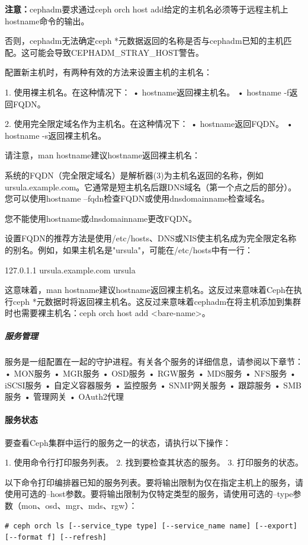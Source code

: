 \documentclass[12pt,UTF8]{ctexbook}
\begin{document}
\textbf{注意：}cephadm要求通过ceph orch host add给定的主机名必须等于远程主机上hostname命令的输出。

否则，cephadm无法确定ceph *元数据返回的名称是否与cephadm已知的主机匹配。这可能会导致CEPHADM_STRAY_HOST警告。

配置新主机时，有两种有效的方法来设置主机的主机名：

1. 使用裸主机名。在这种情况下：
   • hostname返回裸主机名。
   • hostname -f返回FQDN。

2. 使用完全限定域名作为主机名。在这种情况下：
   • hostname返回FQDN。
   • hostname -s返回裸主机名。

请注意，man hostname建议hostname返回裸主机名：

系统的FQDN（完全限定域名）是解析器(3)为主机名返回的名称，例如ursula.example.com。它通常是短主机名后跟DNS域名（第一个点之后的部分）。您可以使用hostname --fqdn检查FQDN或使用dnsdomainname检查域名。

您不能使用hostname或dnsdomainname更改FQDN。

设置FQDN的推荐方法是使用/etc/hosts、DNS或NIS使主机名成为完全限定名称的别名。例如，如果主机名是"ursula"，可能在/etc/hosts中有一行：

127.0.1.1    ursula.example.com ursula

这意味着，man hostname建议hostname返回裸主机名。这反过来意味着Ceph在执行ceph *元数据时将返回裸主机名。这反过来意味着cephadm在将主机添加到集群时也需要裸主机名：ceph orch host add <bare-name>。

\subparagraph{服务管理}

服务是一组配置在一起的守护进程。有关各个服务的详细信息，请参阅以下章节：
• MON服务
• MGR服务
• OSD服务
• RGW服务
• MDS服务
• NFS服务
• iSCSI服务
• 自定义容器服务
• 监控服务
• SNMP网关服务
• 跟踪服务
• SMB服务
• 管理网关
• OAuth2代理

\paragraph{服务状态}

要查看Ceph集群中运行的服务之一的状态，请执行以下操作：

1. 使用命令行打印服务列表。
2. 找到要检查其状态的服务。
3. 打印服务的状态。

以下命令打印编排器已知的服务列表。要将输出限制为仅在指定主机上的服务，请使用可选的--host参数。要将输出限制为仅特定类型的服务，请使用可选的--type参数（mon、osd、mgr、mds、rgw）：
\begin{verbatim}
# ceph orch ls [--service_type type] [--service_name name] [--export] [--format f] [--refresh]
\end{verbatim}
\end{document}
